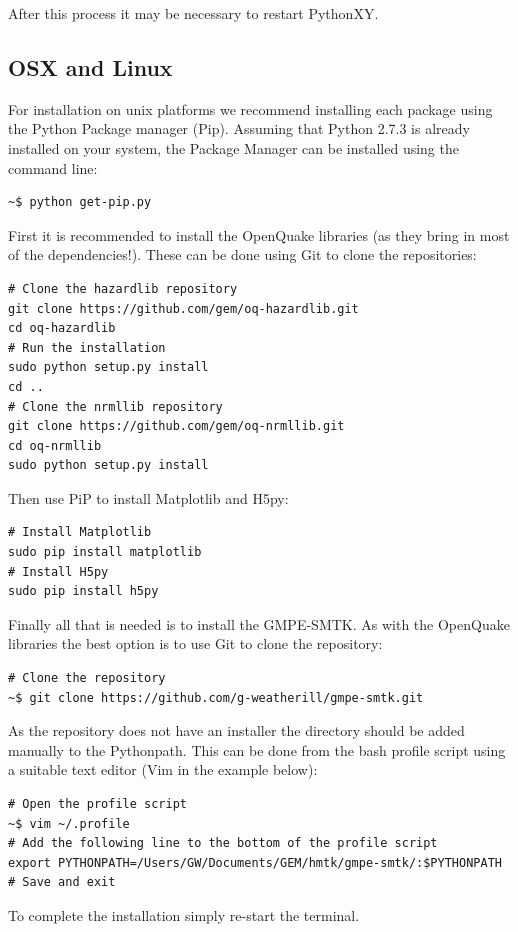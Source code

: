 After this process it may be necessary to restart PythonXY.

\subsection{OSX and Linux}

For installation on unix platforms we recommend installing each package using the Python Package manager (Pip). Assuming that Python 2.7.3 is already installed on your system, the Package Manager can be installed using the command line:

\begin{verbatim}
~$ python get-pip.py 
\end{verbatim}

First it is recommended to install the OpenQuake libraries (as they bring in most of the dependencies!). These can be done using Git to clone the repositories:

\begin{verbatim}
# Clone the hazardlib repository
git clone https://github.com/gem/oq-hazardlib.git
cd oq-hazardlib
# Run the installation
sudo python setup.py install
cd ..
# Clone the nrmllib repository
git clone https://github.com/gem/oq-nrmllib.git
cd oq-nrmllib
sudo python setup.py install
\end{verbatim}

Then use PiP to install Matplotlib and H5py:

\begin{verbatim}
# Install Matplotlib
sudo pip install matplotlib
# Install H5py
sudo pip install h5py
\end{verbatim}

Finally all that is needed is to install the GMPE-SMTK. As with the OpenQuake libraries the best option is to use Git to clone the repository:

\begin{verbatim}
# Clone the repository
~$ git clone https://github.com/g-weatherill/gmpe-smtk.git
\end{verbatim}

As the repository does not have an installer the directory should be added manually to the Pythonpath. This can be done from the bash profile script using a suitable text editor (Vim in the example below):

\begin{verbatim}
# Open the profile script
~$ vim ~/.profile
# Add the following line to the bottom of the profile script
export PYTHONPATH=/Users/GW/Documents/GEM/hmtk/gmpe-smtk/:$PYTHONPATH
# Save and exit
\end{verbatim}

To complete the installation simply re-start the terminal.








